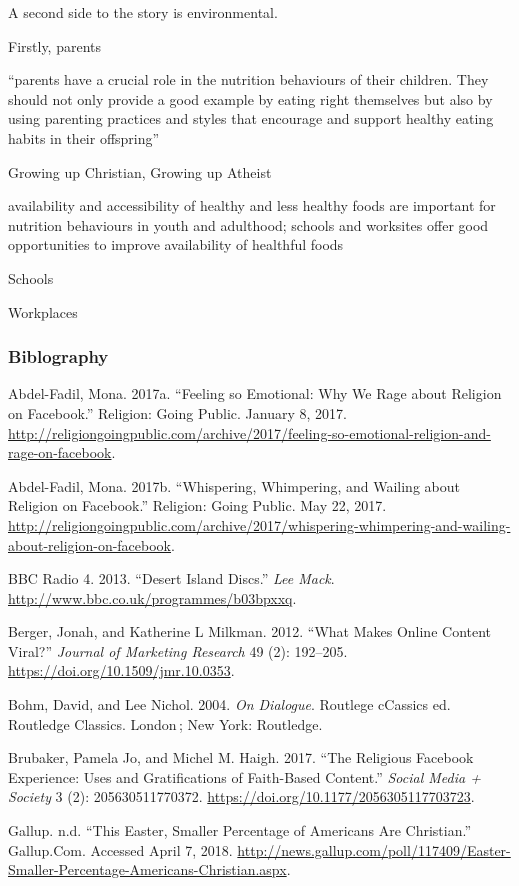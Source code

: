 \documentclass[]{article}
\begin{document}
A second side to the story is environmental.

Firstly, parents

``parents have a crucial role in the nutrition behaviours of their
children. They should not only provide a good example by eating right
themselves but also by using parenting practices and styles that
encourage and support healthy eating habits in their offspring''

Growing up Christian, Growing up Atheist

availability and accessibility of healthy and less healthy foods are
important for nutrition behaviours in youth and adulthood; schools and
worksites offer good opportunities to improve availability of healthful
foods

Schools

Workplaces

\hypertarget{biblography}{%
\subsubsection{Biblography}\label{biblography}}

Abdel-Fadil, Mona. 2017a. ``Feeling so Emotional: Why We Rage about
Religion on Facebook.'' Religion: Going Public. January 8, 2017.
\url{http://religiongoingpublic.com/archive/2017/feeling-so-emotional-religion-and-rage-on-facebook}.

Abdel-Fadil, Mona. 2017b. ``Whispering, Whimpering, and Wailing about
Religion on Facebook.'' Religion: Going Public. May 22, 2017.
\url{http://religiongoingpublic.com/archive/2017/whispering-whimpering-and-wailing-about-religion-on-facebook}.

BBC Radio 4. 2013. ``Desert Island Discs.'' \emph{Lee Mack}.
\url{http://www.bbc.co.uk/programmes/b03bpxxq}.

Berger, Jonah, and Katherine L Milkman. 2012. ``What Makes Online
Content Viral?'' \emph{Journal of Marketing Research} 49 (2): 192--205.
\url{https://doi.org/10.1509/jmr.10.0353}.

Bohm, David, and Lee Nichol. 2004. \emph{On Dialogue}. Routlege cCassics
ed. Routledge Classics. London\,; New York: Routledge.

Brubaker, Pamela Jo, and Michel M. Haigh. 2017. ``The Religious Facebook
Experience: Uses and Gratifications of Faith-Based Content.''
\emph{Social Media + Society} 3 (2): 205630511770372.
\url{https://doi.org/10.1177/2056305117703723}.

Gallup. n.d. ``This Easter, Smaller Percentage of Americans Are
Christian.'' Gallup.Com. Accessed April 7, 2018.
\url{http://news.gallup.com/poll/117409/Easter-Smaller-Percentage-Americans-Christian.aspx}.
\end{document}
